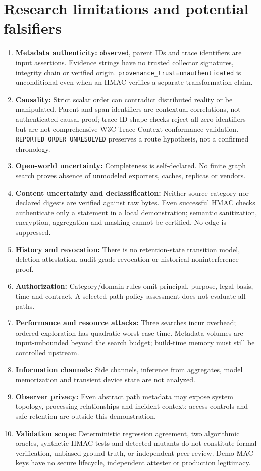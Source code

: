 \documentclass[11pt,letterpaper]{article}
\newcommand{\code}[1]{\texttt{#1}}
\newcommand{\st}[1]{\texttt{\scriptsize #1}}
\begin{document}
\section{Research limitations and potential falsifiers}
\begin{enumerate}
\item \textbf{Metadata authenticity:} \code{observed}, parent IDs and trace identifiers are input assertions. Evidence strings have no trusted collector signatures, integrity chain or verified origin. \code{provenance\_trust=unauthenticated} is unconditional even when an HMAC verifies a separate transformation claim.
\item \textbf{Causality:} Strict scalar order can contradict distributed reality or be manipulated. Parent and span identifiers are contextual correlations, not authenticated causal proof; trace ID shape checks reject all-zero identifiers but are not comprehensive W3C Trace Context conformance validation. \st{REPORTED\_ORDER\_UNRESOLVED} preserves a route hypothesis, not a confirmed chronology.
\item \textbf{Open-world uncertainty:} Completeness is self-declared. No finite graph search proves absence of unmodeled exporters, caches, replicas or vendors.
\item \textbf{Content uncertainty and declassification:} Neither source category nor declared digests are verified against raw bytes. Even successful HMAC checks authenticate only a statement in a local demonstration; semantic sanitization, encryption, aggregation and masking cannot be certified. No edge is suppressed.
\item \textbf{History and revocation:} There is no retention-state transition model, deletion attestation, audit-grade revocation or historical noninterference proof.
\item \textbf{Authorization:} Category/domain rules omit principal, purpose, legal basis, time and contract. A selected-path policy assessment does not evaluate all paths.
\item \textbf{Performance and resource attacks:} Three searches incur overhead; ordered exploration has quadratic worst-case time. Metadata volumes are input-unbounded beyond the search budget; build-time memory must still be controlled upstream.
\item \textbf{Information channels:} Side channels, inference from aggregates, model memorization and transient device state are not analyzed.
\item \textbf{Observer privacy:} Even abstract path metadata may expose system topology, processing relationships and incident context; access controls and safe retention are outside this demonstration.
\item \textbf{Validation scope:} Deterministic regression agreement, two algorithmic oracles, synthetic HMAC tests and detected mutants do not constitute formal verification, unbiased ground truth, or independent peer review. Demo MAC keys have no secure lifecycle, independent attester or production legitimacy.
\end{enumerate}
\end{document}
